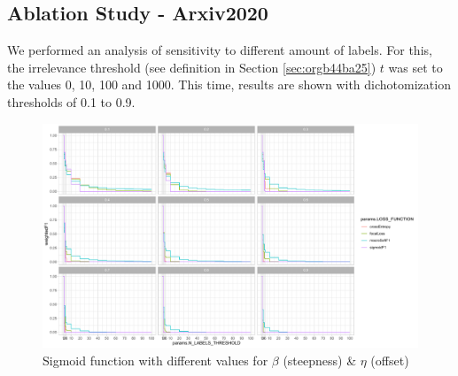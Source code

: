 \subsection{Ablation Study - Arxiv2020}

We performed an analysis of sensitivity to different amount of labels. For this, the irrelevance threshold (see definition in Section \ref{sec:orgb44ba25}) $t$ was set to the values 0, 10, 100 and 1000. This time, results are shown with dichotomization thresholds of 0.1 to 0.9. 


\begin{figure}[htbp]
\centering
\includegraphics[width=.9\linewidth]{./images/ablation.pdf}
\caption{\label{fig:ablation}
Sigmoid function with different values for $\beta$ (steepness) \& $\eta$ (offset)}
\end{figure}




